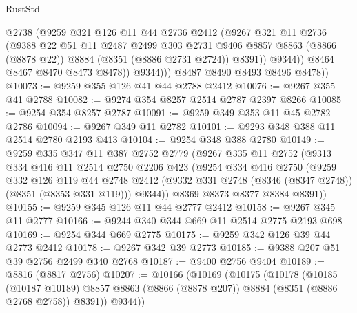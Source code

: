 \begin{lexlean}{RustStd}
\begin{coremodule}
                    @2738
                    (@9259
                      @321
                      @126
                      @11
                      @44
                      @2736
                      @2412
                      (@9267
                        @321
                        @11
                        @2736
                        (@9388
                          @22
                          @51
                          @11
                          @2487
                          @2499
                          @303
                          @2731
                          @9406
                          @8857
                          @8863
                          (@8866 (@8878 @22))
                          @8884
                          (@8351 (@8886 @2731 @2724))
                          @8391))
                      @9344))
                  @8464
                  @8467
                  @8470
                  @8473
                  @8478))
              @9344)))
        @8487
        @8490
        @8493
        @8496
        @8478))
@10073 := @9259 @355 @126 @41 @44 @2788 @2412
@10076 := @9267 @355 @41 @2788
@10082 := @9274 @354 @8257 @2514 @2787 @2397 @8266
@10085 := @9254 @354 @8257 @2787
@10091 := @9259 @349 @353 @11 @45 @2782 @2786
@10094 := @9267 @349 @11 @2782
@10101 := @9293 @348 @388 @11 @2514 @2780 @2193 @413
@10104 := @9254 @348 @388 @2780
@10149 := @9259
    @335
    @347
    @11
    @387
    @2752
    @2779
    (@9267
      @335
      @11
      @2752
      (@9313
        @334
        @416
        @11
        @2514
        @2750
        @2206
        @423
        (@9254
          @334
          @416
          @2750
          (@9259
            @332
            @126
            @119
            @44
            @2748
            @2412
            (@9332 @331 @2748 (@8346 (@8347 @2748)) (@8351 (@8353 @331 @119)))
            @9344))
        @8369
        @8373
        @8377
        @8384
        @8391))
@10155 := @9259 @345 @126 @11 @44 @2777 @2412
@10158 := @9267 @345 @11 @2777
@10166 := @9244 @340 @344 @669 @11 @2514 @2775 @2193 @698
@10169 := @9254 @344 @669 @2775
@10175 := @9259 @342 @126 @39 @44 @2773 @2412
@10178 := @9267 @342 @39 @2773
@10185 := @9388 @207 @51 @39 @2756 @2499 @340 @2768
@10187 := @9400 @2756 @9404
@10189 := @8816 (@8817 @2756)
@10207 := @10166
    (@10169
      (@10175
        (@10178
          (@10185
            (@10187 @10189)
            @8857
            @8863
            (@8866 (@8878 @207))
            @8884
            (@8351 (@8886 @2768 @2758))
            @8391))
        @9344))

\end{coremodule}
\end{lexlean}
